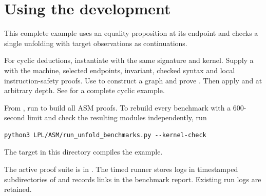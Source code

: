 \section{Using the development}\label{sec:usage}
This complete example uses an equality proposition at its endpoint and
checks a single unfolding with target observations as continuations.


For cyclic deductions, instantiate  with the same
signature and kernel. Supply a  with the machine, selected
endpoints, invariant, checked syntax and local instruction-safety proofs.
Use  to construct a graph and prove .
Then apply  and  at arbitrary depth.
See  for a complete cyclic example.

From , run  to build all ASM proofs.
To rebuild every benchmark with a 600-second limit and check the resulting
modules independently, run
\begin{lstlisting}[language={}]
python3 LPL/ASM/run_unfold_benchmarks.py --kernel-check
\end{lstlisting}
The target  in this directory compiles the example.

The active proof suite is in . The timed runner stores
logs in timestamped subdirectories of  and records
links in the benchmark report. Existing run logs are retained.
